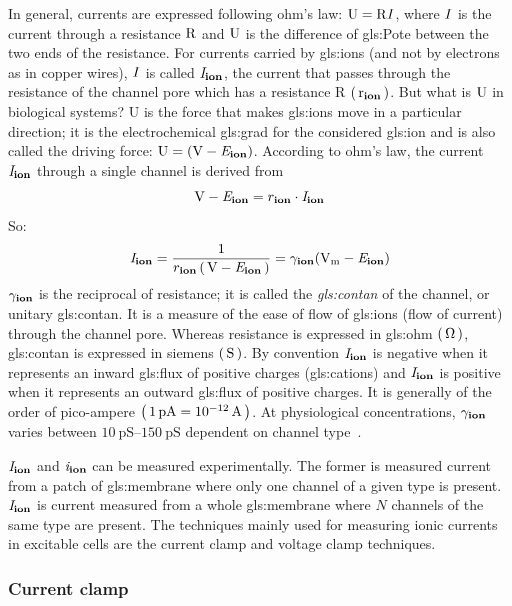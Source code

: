 \documentclass[class={myRUCProject}, crop=false]{standalone}
\begin{document}
In general, currents are expressed following ohm's law: \(\mathrm{U}=\mathrm{R}\mathit{I}\), where \(\mathit{I}\) is the current through a resistance \(\mathrm{R}\) and \(\mathrm{U}\) is the difference of \gls{gls:Pote} between the two ends of the resistance. 
For currents carried by \glspl{gls:ion} (and not by electrons as in copper wires), \(\mathit{I}\) is called \(\mathit{I}_\mathbf{ion}\), the current that passes through the resistance of the channel pore which has a resistance R \(\left(\,\mathrm{r}_\mathbf{ion}\,\right)\). But what is \(\mathrm{U}\) in biological systems? 
\unit{U} is the force that makes \glspl{gls:ion} move in a particular direction; it is the electrochemical \gls{gls:grad} for the considered \gls{gls:ion} and is also called the driving force: \(\rmm{U}=(\unit{\V} - \equi\ion)\). According to ohm's law, the current \(\mathit{I}_\mathbf{ion}\) through a single channel is derived from 
\begin{equation}
  \unit{\V} - \equi\ion = r\ion \cdot \curr\ion
\end{equation}
So:
\begin{equation}\label{eq:cur2con}
  \curr\ion= \frac{1}{r\ion\br{\unit{\V} - \equi\ion}} = \ucon\ion(\unit{\V\membrane} - \equi\ion)
\end{equation}
\(\gamma_\mathbf{ion}\) is the reciprocal of resistance; it is called the \textit{\gls{gls:contan}} of the channel, or unitary \gls{gls:contan}. It is a measure of the ease of flow of \glspl{gls:ion} (flow of current) through the channel pore. Whereas resistance is expressed in \gls{gls:ohm} \(\br{\unit{\ohm}}\), \gls{gls:contan} is expressed in siemens \(\br{\unit{\siemens}}\). By convention \(\mathit{I}_\mathbf{ion}\) is negative when it represents an inward \gls{gls:flux} of positive charges (\glspl{gls:cation}) and \(\mathit{I}_\mathbf{ion}\) is positive when it represents an outward \gls{gls:flux} of positive charges. It is generally of the order of pico-ampere \(\br{\qty{1}{\pico\ampere}=\qty{e-12}{\ampere}}\). At physiological concentrations, \(\gamma_\mathbf{ion}\) varies between \(\qtyrange{10}{150}{\pico\siemens}\) dependent on channel type~\cite{Hammond2015ch4}.

\(\mathit{I}_\mathbf{ion}\) and \(\mathit{i}_\mathbf{ion}\) can be measured experimentally. The former is measured current from a patch of \gls{gls:membrane} where only one channel of a given type is present. \(\mathit{I}_\mathbf{ion}\) is current measured from a whole \gls{gls:membrane} where \(N\) channels of the same type are present. The techniques mainly used for measuring ionic currents in excitable cells are the current clamp and voltage clamp techniques.

\subsubsection{Current clamp}\label{sec:Cclamp}
\end{document}
